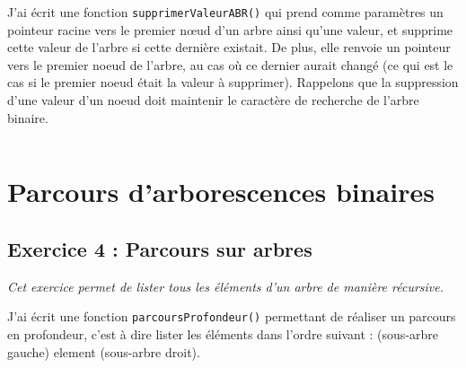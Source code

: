 J'ai écrit une fonction \texttt{supprimerValeurABR()} qui prend comme paramètres un pointeur racine vers le premier nœud d’un arbre ainsi qu’une valeur, et supprime cette valeur de l’arbre si cette dernière existait. De plus, elle renvoie un pointeur vers le premier noeud de l’arbre, au cas où ce dernier aurait changé (ce qui est le cas si le premier noeud était la valeur à supprimer). Rappelons que la suppression d’une valeur d’un noeud doit maintenir le caractère de recherche de l’arbre binaire.
\inputminted[linenos,firstline=21, lastline=123]{cpp}{../sources/cpp/TP3-4/modifArbres.c}

\section{Parcours d’arborescences binaires}

\subsection{Exercice 4 : Parcours sur arbres}
\textit{Cet exercice permet de lister tous les éléments d'un arbre de manière récursive.}

J'ai écrit une fonction \texttt{parcoursProfondeur()} permettant de réaliser un parcours en profondeur, c’est à dire lister les éléments dans l’ordre suivant : (sous-arbre gauche) element (sous-arbre droit).
\inputminted[linenos,firstline=8, lastline=21]{cpp}{../sources/cpp/TP3-4/parcoursArbres.c}
